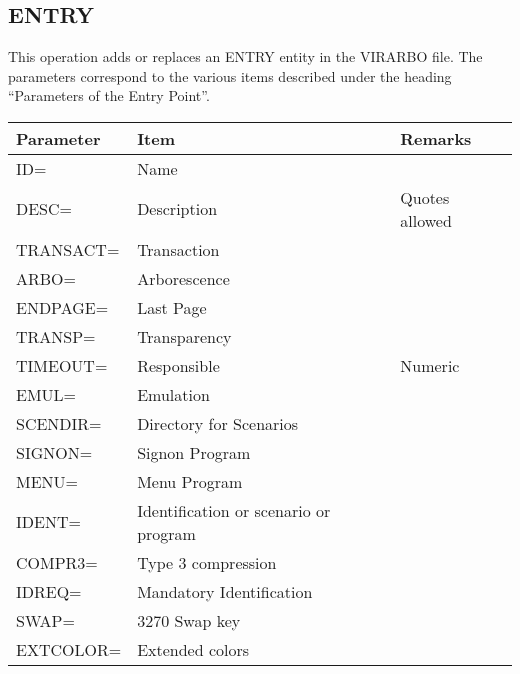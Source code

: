 \documentclass[letterpaper,10pt,english]{sphinxmanual}
\begin{document}
\ignorespaces 

\subsection{ENTRY}
\label{\detokenize{Installation_Guide:entry}}\label{\detokenize{Installation_Guide:index-163}}
This operation adds or replaces an ENTRY entity in the VIRARBO file. The parameters correspond to the various items
described under the heading “Parameters of the Entry Point”.


\begin{savenotes}\sphinxattablestart
\centering
\begin{tabulary}{\linewidth}[t]{|T|T|T|}
\hline
\sphinxstyletheadfamily 
Parameter
&\sphinxstyletheadfamily 
Item
&\sphinxstyletheadfamily 
Remarks
\\
\hline
ID=
&
Name
&\\
\hline
DESC=
&
Description
&
Quotes allowed
\\
\hline
TRANSACT=
&
Transaction
&\\
\hline
ARBO=
&
Arborescence
&\\
\hline
ENDPAGE=
&
Last Page
&\\
\hline
TRANSP=
&
Transparency
&\\
\hline
TIMEOUT=
&
Responsible
&
Numeric
\\
\hline
EMUL=
&
Emulation
&\\
\hline
SCENDIR=
&
Directory for
Scenarios
&\\
\hline
SIGNON=
&
Signon Program
&\\
\hline
MENU=
&
Menu Program
&\\
\hline
IDENT=
&
Identification or
scenario or program
&\\
\hline
COMPR3=
&
Type 3 compression
&\\
\hline
IDREQ=
&
Mandatory
Identification
&\\
\hline
SWAP=
&
3270 Swap key
&\\
\hline
EXTCOLOR=
&
Extended colors
&\\
\hline
\end{tabulary}
\par
\sphinxattableend\end{savenotes}

\ignorespaces 
\end{document}
